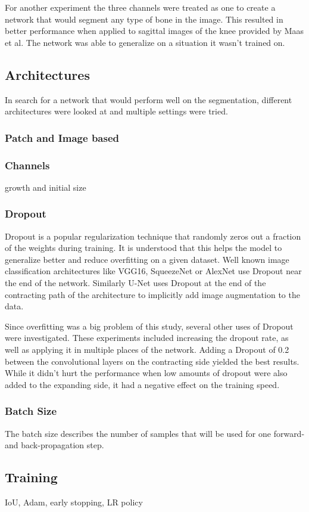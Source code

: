 For another experiment the three channels were treated as one to create a network that would segment any type of bone in the image. This resulted in better performance when applied to sagittal images of the knee provided by Maas et al. The network was able to generalize on a situation it wasn't trained on.

\subsection{Architectures}



In search for a network that would perform well on the segmentation, different architectures were looked at and multiple settings were tried.

\subsubsection{Patch and Image based}




\subsubsection{Channels}

growth and initial size

\subsubsection{Dropout}

Dropout is a popular regularization technique that randomly zeros out a fraction of the weights during training. It is understood that this helps the model to generalize better and reduce overfitting on a given dataset. Well known image classification architectures like VGG16, SqueezeNet or AlexNet use Dropout near the end of the network. Similarly U-Net uses Dropout at the end of the contracting path of the architecture to implicitly add image augmentation to the data.

Since overfitting was a big problem of this study, several other uses of Dropout were investigated. These experiments included increasing the dropout rate, as well as applying it in multiple places of the network. Adding a Dropout of 0.2 between the convolutional layers on the contracting side yielded the best results. While it didn't hurt the performance when low amounts of dropout were also added to the expanding side, it had a negative effect on the training speed.


\subsubsection{Batch Size}

The batch size describes the number of samples that will be used for one forward- and back-propagation step.

\subsection{Training}

IoU, Adam, early stopping, LR policy

\newpage
